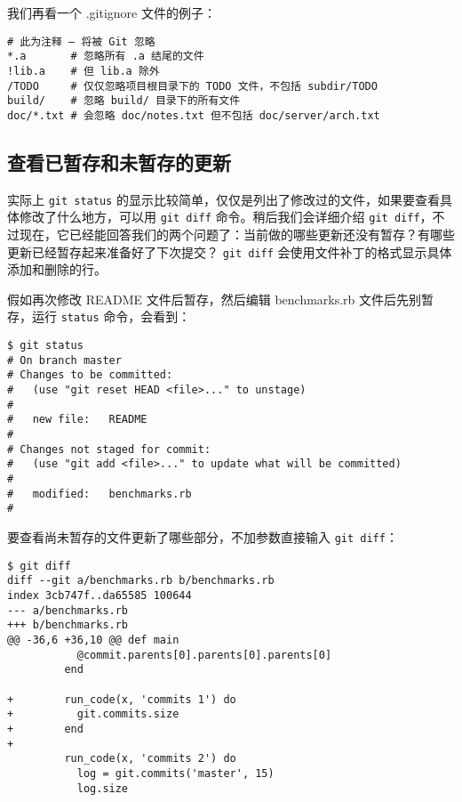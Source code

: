 \documentclass[a4paper]{book}
\begin{document}
我们再看一个 .gitignore 文件的例子：

\begin{shaded}\begin{verbatim}
# 此为注释 – 将被 Git 忽略
*.a       # 忽略所有 .a 结尾的文件
!lib.a    # 但 lib.a 除外
/TODO     # 仅仅忽略项目根目录下的 TODO 文件，不包括 subdir/TODO
build/    # 忽略 build/ 目录下的所有文件
doc/*.txt # 会忽略 doc/notes.txt 但不包括 doc/server/arch.txt
\end{verbatim}\end{shaded}

\subsection{查看已暂存和未暂存的更新}

实际上 \texttt{git status} 的显示比较简单，仅仅是列出了修改过的文件，如果要查看具体修改了什么地方，可以用 \texttt{git diff} 命令。稍后我们会详细介绍 \texttt{git diff}，不过现在，它已经能回答我们的两个问题了：当前做的哪些更新还没有暂存？有哪些更新已经暂存起来准备好了下次提交？ \texttt{git diff} 会使用文件补丁的格式显示具体添加和删除的行。

假如再次修改 README 文件后暂存，然后编辑 benchmarks.rb 文件后先别暂存，运行 \texttt{status} 命令，会看到：

\begin{shaded}\begin{verbatim}
$ git status
# On branch master
# Changes to be committed:
#   (use "git reset HEAD <file>..." to unstage)
#
#	new file:   README
#
# Changes not staged for commit:
#   (use "git add <file>..." to update what will be committed)
#
#	modified:   benchmarks.rb
#
\end{verbatim}\end{shaded}

要查看尚未暂存的文件更新了哪些部分，不加参数直接输入 \texttt{git diff}：

\begin{shaded}\begin{verbatim}
$ git diff
diff --git a/benchmarks.rb b/benchmarks.rb
index 3cb747f..da65585 100644
--- a/benchmarks.rb
+++ b/benchmarks.rb
@@ -36,6 +36,10 @@ def main
           @commit.parents[0].parents[0].parents[0]
         end

+        run_code(x, 'commits 1') do
+          git.commits.size
+        end
+
         run_code(x, 'commits 2') do
           log = git.commits('master', 15)
           log.size
\end{verbatim}\end{shaded}
\end{document}

